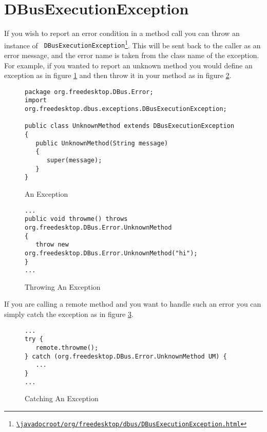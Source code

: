 \documentclass[a4paper,12pt]{article}
\begin{document}
\section{DBusExecutionException}

If you wish to report an error condition in a method call you can throw an
instance of {\tt
DBusExecutionException\footnote{\url{\javadocroot/org/freedesktop/dbus/DBusExecutionException.html}}}.
This will be sent back to the caller as an error message, and the error name is
taken from the class name of the exception. For example, if you wanted to
report an unknown method you would define an exception as in figure
\ref{fig:exceptiondef} and then throw it in your method as in figure
\ref{fig:exceptioncall}.

\begin{figure}[htb]
\begin{center}
\begin{verbatim}
package org.freedesktop.DBus.Error;
import org.freedesktop.dbus.exceptions.DBusExecutionException;

public class UnknownMethod extends DBusExecutionException
{
   public UnknownMethod(String message)
   {
      super(message);
   }
}
\end{verbatim}
\end{center}
\caption{An Exception}
\label{fig:exceptiondef}
\end{figure}

\begin{figure}[htb]
\begin{center}
\begin{verbatim}
...
public void throwme() throws org.freedesktop.DBus.Error.UnknownMethod
{
   throw new org.freedesktop.DBus.Error.UnknownMethod("hi");
}
...
\end{verbatim}
\end{center}
\caption{Throwing An Exception}
\label{fig:exceptioncall}
\end{figure}

If you are calling a remote method and you want to handle such an error you can
simply catch the exception as in figure \ref{fig:exceptioncatch}. 

\begin{figure}[htb]
\begin{center}
\begin{verbatim}
...
try {
   remote.throwme();
} catch (org.freedesktop.DBus.Error.UnknownMethod UM) {
   ...
}
...
\end{verbatim}
\end{center}
\caption{Catching An Exception}
\label{fig:exceptioncatch}
\end{figure}
\end{document}

